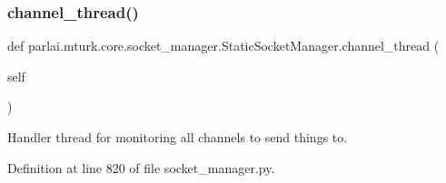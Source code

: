 \subsubsection{\texorpdfstring{channel\+\_\+thread()}{channel\_thread()}}
{\footnotesize\ttfamily def parlai.\+mturk.\+core.\+socket\+\_\+manager.\+Static\+Socket\+Manager.\+channel\+\_\+thread (\begin{DoxyParamCaption}\item[{}]{self }\end{DoxyParamCaption})}

\begin{DoxyVerb}Handler thread for monitoring all channels to send things to.
\end{DoxyVerb}
 

Definition at line 820 of file socket\+\_\+manager.\+py.



